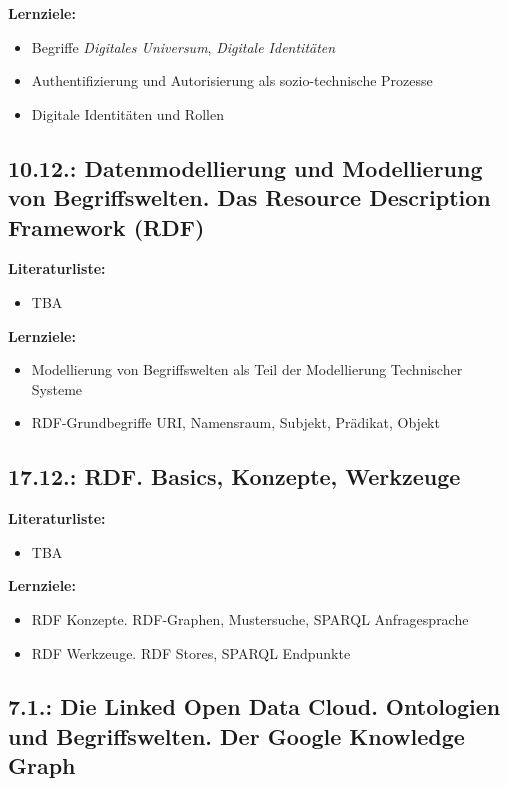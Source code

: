 \documentclass[11pt,a4paper]{article}
\begin{document}
\textbf{Lernziele:}
\begin{itemize}[noitemsep]
\item Begriffe \emph{Digitales Universum}, \emph{Digitale Identitäten}
\item Authentifizierung und Autorisierung als sozio-technische Prozesse
\item Digitale Identitäten und Rollen
\end{itemize}

\subsection{10.12.: Datenmodellierung und Modellierung von Begriffswelten.
  Das Resource Description Framework (RDF)}

\textbf{Literaturliste:}
\begin{itemize}[noitemsep]
\item TBA
\end{itemize}

\textbf{Lernziele:}
\begin{itemize}[noitemsep]
\item Modellierung von Begriffswelten als Teil der Modellierung Technischer Systeme
\item RDF-Grundbegriffe URI, Namensraum, Subjekt, Prädikat, Objekt
\end{itemize}

\subsection{17.12.: RDF. Basics, Konzepte, Werkzeuge}

\textbf{Literaturliste:}
\begin{itemize}
\item TBA
\end{itemize}

\textbf{Lernziele:}
\begin{itemize}[noitemsep]
\item RDF Konzepte. RDF-Graphen, Mustersuche, SPARQL Anfragesprache
\item RDF Werkzeuge. RDF Stores, SPARQL Endpunkte
\end{itemize}

\subsection{7.1.: Die Linked Open Data Cloud. Ontologien und Begriffswelten.
Der Google Knowledge Graph}
\end{document}
